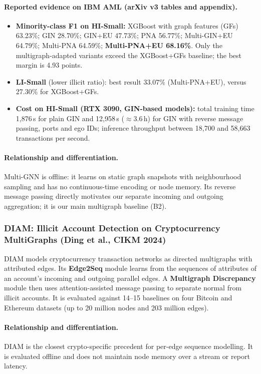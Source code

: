 \documentclass[11pt,a4paper]{article}
\begin{document}
\paragraph{Reported evidence on IBM AML (arXiv v3 tables and appendix).}
\begin{itemize}[leftmargin=*]
    \item \textbf{Minority-class F1 on HI-Small:} XGBoost with graph features (GFs) 63.23\%; GIN 28.70\%; GIN+EU 47.73\%; PNA 56.77\%; Multi-GIN+EU 64.79\%; Multi-PNA 64.59\%; \textbf{Multi-PNA+EU 68.16\%}. Only the multigraph-adapted variants exceed the XGBoost+GFs baseline; the best margin is 4.93 points.
    \item \textbf{LI-Small} (lower illicit ratio): best result 33.07\% (Multi-PNA+EU), versus 27.30\% for XGBoost+GFs.
    \item \textbf{Cost on HI-Small (RTX 3090, GIN-based models):} total training time 1,876\,s for plain GIN and 12,958\,s ($\approx$3.6\,h) for GIN with reverse message passing, ports and ego IDs; inference throughput between 18,700 and 58,663 transactions per second.
\end{itemize}

\paragraph{Relationship and differentiation.} Multi-GNN is offline: it learns on static graph snapshots with neighbourhood sampling and has no continuous-time encoding or node memory. Its reverse message passing directly motivates our separate incoming and outgoing aggregation; it is our main multigraph baseline (B2).

\subsubsection{DIAM: Illicit Account Detection on Cryptocurrency MultiGraphs (Ding et al., CIKM 2024)}
DIAM \cite{ding2024diam} models cryptocurrency transaction networks as directed multigraphs with attributed edges. Its \textbf{Edge2Seq} module learns from the sequences of attributes of an account's incoming and outgoing parallel edges. A \textbf{Multigraph Discrepancy} module then uses attention-assisted message passing to separate normal from illicit accounts. It is evaluated against 14--15 baselines on four Bitcoin and Ethereum datasets (up to 20 million nodes and 203 million edges).

\paragraph{Relationship and differentiation.} DIAM is the closest crypto-specific precedent for per-edge sequence modelling. It is evaluated offline and does not maintain node memory over a stream or report latency.
\end{document}
